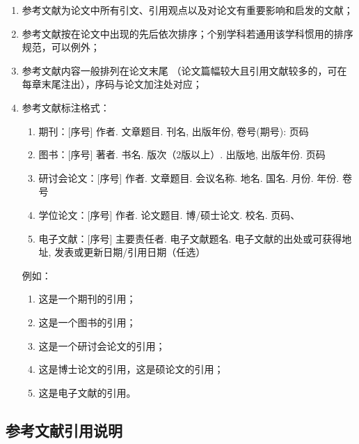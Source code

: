 \begin{enumerate}
    \item 参考文献为论文中所有引文、引用观点以及对论文有重要影响和启发的文献；
    \item 参考文献按在论文中出现的先后依次排序；个别学科若通用该学科惯用的排序规范，可以例外；
    \item 参考文献内容一般排列在论文末尾 （论文篇幅较大且引用文献较多的，可在每章末尾注出），序码与论文加注处对应；
    \item 参考文献标注格式：
        \begin{enumerate}
            \item 期刊：[序号] 作者. 文章题目. 刊名, 出版年份, 卷号(期号): 页码
            \item 图书：[序号] 著者. 书名. 版次（2版以上）. 出版地, 出版年份. 页码
            \item 研讨会论文：[序号] 作者. 文章题目. 会议名称. 地名. 国名. 月份. 年份. 卷号
            \item 学位论文：[序号] 作者. 论文题目. 博/硕士论文. 校名. 页码、
            \item 电子文献：[序号] 主要责任者. 电子文献题名. 电子文献的出处或可获得地址, 发表或更新日期/引用日期（任选）
        \end{enumerate}

    例如：
        \begin{enumerate}
            \item 这是一个期刊的引用\cite{LIGOScientific:2017zic}；
            \item 这是一个图书的引用\cite{Rubakov:2017xzr}；
            \item 这是一个研讨会论文的引用\cite{Tanikawa:2021+x}；
            \item 这是博士论文的引用\cite{Migenda:2019xbm,HuangGuoYuan:2020}，这是硕论文的引用\cite{Shojaeifar:2015csv,SongRen:2020}；
            \item 这是电子文献的引用\cite{Piro:2021oaa,bilibili:read}。
        \end{enumerate}
\end{enumerate}

\subsection{参考文献引用说明}

